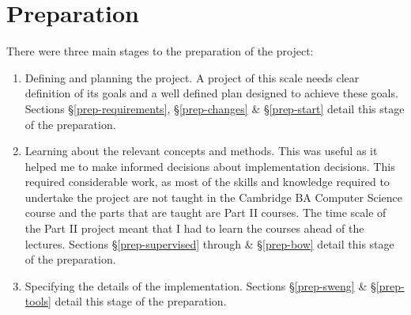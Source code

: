 \documentclass[12pt,a4paper,twoside,openright]{report}
\begin{document}
\chapter{Preparation} \label{prep}

There were three main stages to the preparation of the project:
\begin{enumerate}
	\item Defining and planning the project. A project of this scale needs clear definition of its goals and a well defined plan designed to achieve these goals. Sections \S\ref{prep-requirements}, \S\ref{prep-changes} \& \S\ref{prep-start} detail this stage of the preparation.

	\item Learning about the relevant concepts and methods. This was useful as it helped me to make informed decisions about implementation decisions. This required considerable work, as most of the skills and knowledge required to undertake the project are not taught in the Cambridge BA Computer Science course and the parts that are taught are Part II courses. The time scale of the Part II project meant that I had to learn the courses ahead of the lectures. Sections \S\ref{prep-supervised} through \& \S\ref{prep-bow} detail this stage of the preparation.
	
	\item Specifying the details of the implementation. Sections \S\ref{prep-sweng} \& \S\ref{prep-tools} detail this stage of the preparation.
\end{enumerate}
\end{document}
